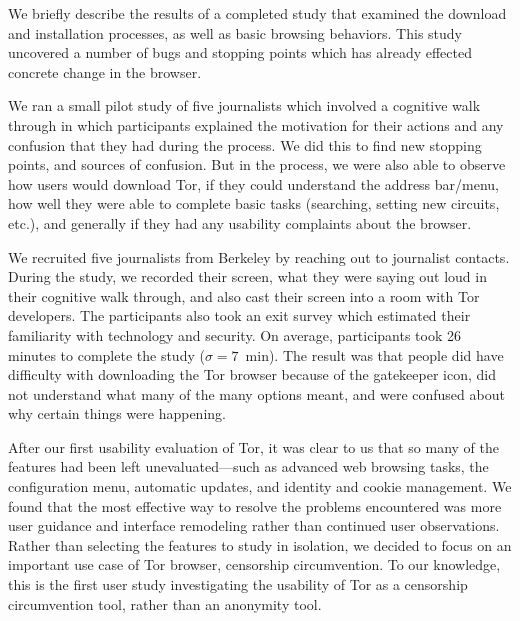 \documentclass{sig-alternate-hotpets15}
\begin{document}
We briefly describe the results of a completed study
that examined the download and installation processes, 
as well as basic browsing behaviors.
This study uncovered a number of bugs and stopping points
which has already effected concrete change in the browser.

We ran a small pilot study of five journalists which involved a cognitive walk through in which 
participants explained the motivation for their actions and any confusion that they had during the process. 
We did this to find new stopping points, and sources of confusion. 
But in the process, we were also able to observe how users would download Tor, 
if they could understand the address bar/menu, how well they were able to complete basic tasks
(searching, setting new circuits, etc.), and generally if they had any usability complaints about the browser. 

We recruited five journalists from Berkeley by reaching out to journalist contacts. 
During the study, we recorded their screen, what they were saying out loud in their cognitive walk through, and also cast their screen into a room with Tor developers. The participants also took an exit survey which estimated their familiarity with technology and security. On average, participants took 26 minutes to complete the study ($\sigma = 7$~min).  The result was that people did have difficulty with downloading the Tor browser because of the gatekeeper icon, did not understand what many of the many options meant, and were confused about why certain things were happening. 

After our first  usability evaluation of Tor, it was clear to us that so many of the features had been left unevaluated---such as advanced web browsing tasks, the configuration menu, automatic updates, and identity and cookie management. 
We found that the most effective way to resolve the problems encountered was more user guidance and interface remodeling rather than continued user observations.
Rather than selecting the features to study in isolation, 
we decided to focus on an important use case of Tor browser, censorship circumvention. 
To our knowledge, this is the first user study investigating the usability of Tor as a 
censorship circumvention tool, rather than an anonymity tool. 
\end{document}
